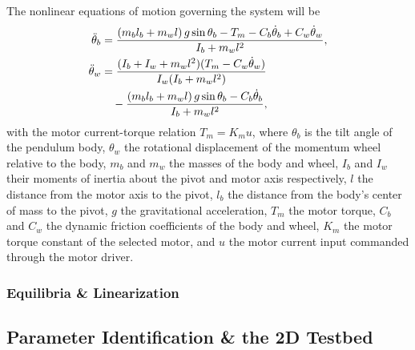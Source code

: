 The nonlinear equations of motion governing the system will be
\begin{align}
\ddot{\theta}_b &= \frac{(m_b l_b + m_w l)\, g \sin\theta_b - T_m - C_b \dot{\theta}_b + C_w \dot{\theta}_w}{I_b + m_w l^2}, \\
\ddot{\theta}_w &= \frac{(I_b + I_w + m_w l^2)(T_m - C_w \dot{\theta}_w)}{I_w (I_b + m_w l^2)} \notag \\
&\quad - \frac{(m_b l_b + m_w l)\, g \sin\theta_b - C_b \dot{\theta}_b}{I_b + m_w l^2},
\end{align}
with the motor current-torque relation $T_m = K_m u$, where $\theta_b$ is the tilt angle of the pendulum body, $\theta_w$ the rotational displacement of the momentum wheel relative to the body, $m_b$ and $m_w$ the masses of the body and wheel, $I_b$ and $I_w$ their moments of inertia about the pivot and motor axis respectively, $l$ the distance from the motor axis to the pivot, $l_b$ the distance from the body's center of mass to the pivot, $g$ the gravitational acceleration, $T_m$ the motor torque, $C_b$ and $C_w$ the dynamic friction coefficients of the body and wheel, $K_m$ the motor torque constant of the selected motor, and $u$ the motor current input commanded through the motor driver.

\subsubsection{Equilibria \& Linearization}
\label{sec:2dequilibria}


\subsection{Parameter Identification \& the 2D Testbed}
\label{sec:paramid}


